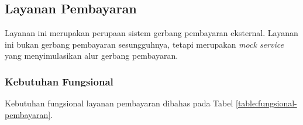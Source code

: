 \subsection{Layanan Pembayaran}

Layanan ini merupakan perupaan sistem gerbang pembayaran eksternal. Layanan ini bukan gerbang pembayaran sesungguhnya, tetapi merupakan \textit{mock service} yang menyimulasikan alur gerbang pembayaran.

\subsubsection{Kebutuhan Fungsional}

Kebutuhan fungsional layanan pembayaran dibahas pada Tabel \ref{table:fungsional-pembayaran}.

\begingroup
\footnotesize
